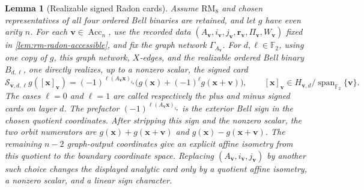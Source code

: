 \documentclass[11pt,letterpaper,onecolumn]{article}
\theoremstyle{plain}
\newtheorem{lemma}[lemma]{Lemma}
\theoremstyle{definition}
\theoremstyle{remark}
\newcommand{\Ftwo}{\mathbb F_2}
\newcommand{\Span}{\operatorname{span}}
\newcommand{\RMcore}{\mathrm{RM}_8}
\begin{document}
\begin{lemma}[Realizable signed Radon cards]
\label{lem:v4-signed-radon}
Assume \(\RMcore\) and chosen representatives of all four ordered Bell
binaries are retained, and let \(g\) have even arity \(n\).  For each
\({\mathbf{v}}\in\operatorname{Acc}_n\), use the recorded data
\((A_{\mathbf{v}},i_{\mathbf{v}},j_{\mathbf{v}},{\mathbf{r}}_{\mathbf{v}},\Pi_{\mathbf{v}},W_{\mathbf{v}})\) fixed in
\cref{lem:rm-radon-accessible}, and fix the graph network
\(\Gamma_{A_{\mathbf{v}}}\).  For \(d,\ell\in\Ftwo\), using one copy of \(g\), this
graph network, \(X\)-edges, and the realizable ordered Bell binary
\(B_{d,\ell}\), one directly realizes, up to a nonzero scalar, the
signed card
\begin{equation}
 \mathcal S_{{\mathbf{v}},d,\ell}g([{\mathbf{x}}]_{\mathbf{v}})
 =(-1)^{\ell(A_{\mathbf{v}}{\mathbf{x}})_{i_{\mathbf{v}}}}
  \bigl(g({\mathbf{x}})+(-1)^\ell g({\mathbf{x}}+{\mathbf{v}})\bigr),
 \qquad [{\mathbf{x}}]_{\mathbf{v}}\in H_{{\mathbf{v}},d}/\Span_{\Ftwo}\{{\mathbf{v}}\}.
 \label{eq:v4-signed-radon}
\end{equation}
The cases \(\ell=0\) and \(\ell=1\) are called respectively the
\emph{plus} and \emph{minus} signed cards on layer \(d\).  The prefactor
\((-1)^{\ell(A_{\mathbf{v}}{\mathbf{x}})_{i_{\mathbf{v}}}}\) is the exterior Bell sign in the chosen
quotient coordinates. After stripping this sign and the nonzero scalar, the two orbit numerators are
\(g({\mathbf{x}})+g({\mathbf{x}}+{\mathbf{v}})\) and \(g({\mathbf{x}})-g({\mathbf{x}}+{\mathbf{v}})\).
The remaining \(n-2\) graph-output coordinates give an explicit affine
isometry from this quotient to the boundary coordinate space.  Replacing
\((A_{\mathbf{v}},i_{\mathbf{v}},j_{\mathbf{v}})\) by another such choice changes the displayed analytic
card only by a quotient affine isometry, a nonzero scalar, and a linear sign
character.
\end{lemma}
\end{document}
